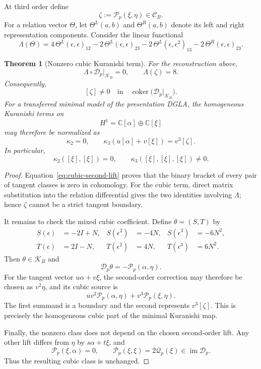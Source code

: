 \documentclass[11pt]{amsart}
\newtheorem{theorem}{Theorem}[section]
\newcommand{\coker}{\operatorname{coker}}
\newcommand{\cD}{\mathscr D}
\newcommand{\cQ}{\mathscr Q}
\newcommand{\cP}{\mathscr P}
\newcommand{\C}{\mathbb C}
\newcommand{\Rel}{\mathscr C}
\begin{document}
At third order define
\[
\zeta:=\cP_p(\xi,\eta)\in\Rel_B.
\]
For a relation vector $\Theta$, let $\Theta^L(a,b)$ and $\Theta^R(a,b)$ denote its left and right representation components.  Consider the linear functional
\begin{equation}\label{eq:cubic-certificate}
\Lambda(\Theta)
=
4\,\Theta^L(\epsilon,\epsilon)_{12}
-2\,\Theta^L(\epsilon,\epsilon)_{23}
-2\,\Theta^L(\epsilon,\epsilon^2)_{13}
-2\,\Theta^R(\epsilon,\epsilon)_{23}.
\end{equation}

\begin{theorem}[Nonzero cubic Kuranishi term]\label{thm:cubic-kuranishi}
For the reconstruction above,
\[
\Lambda\circ\cD_p|_{\mathcal K_B}=0,
\qquad
\Lambda(\zeta)=8.
\]
Consequently,
\[
[\zeta]\ne0
\quad\text{in}\quad
\coker\bigl(\cD_p|_{\mathcal K_B}\bigr).
\]
For a transferred minimal model of the presentation DGLA, the homogeneous Kuranishi terms on
\[
H^1=\C[\alpha]\oplus\C[\xi]
\]
may therefore be normalized as
\[
\boxed{
\kappa_2=0,
\qquad
\kappa_3(u[\alpha]+v[\xi])=v^3[\zeta].
}
\]
In particular,
\[
\kappa_2([\xi],[\xi])=0,
\qquad
\kappa_3([\xi],[\xi],[\xi])\ne0.
\]
\end{theorem}

\begin{proof}
Equation~\eqref{eq:cubic-second-lift} proves that the binary bracket of every pair of tangent classes is zero in cohomology.  For the cubic term, direct matrix substitution into the relation differential gives the two identities involving $\Lambda$; hence $\zeta$ cannot be a strict tangent boundary.

It remains to check the mixed cubic coefficient.  Define $\theta=(S,T)$ by
\begin{align*}
S(\epsilon)&=-2I+N,
&S(\epsilon^2)&=-4N,
&S(\epsilon^3)&=-6N^2,\\
T(\epsilon)&=2I-N,
&T(\epsilon^2)&=4N,
&T(\epsilon^3)&=6N^2.
\end{align*}
Then $\theta\in\mathcal K_B$ and
\[
\cD_p\theta=-\cP_p(\alpha,\eta).
\]
For the tangent vector $u\alpha+v\xi$, the second-order correction may therefore be chosen as $v^2\eta$, and its cubic source is
\[
uv^2\cP_p(\alpha,\eta)+v^3\cP_p(\xi,\eta).
\]
The first summand is a boundary and the second represents $v^3[\zeta]$.  This is precisely the homogeneous cubic part of the minimal Kuranishi map.

Finally, the nonzero class does not depend on the chosen second-order lift.  Any other lift differs from $\eta$ by $s\alpha+t\xi$, and
\[
\cP_p(\xi,\alpha)=0,
\qquad
\cP_p(\xi,\xi)=2\cQ_p(\xi)\in\operatorname{im}\cD_p.
\]
Thus the resulting cubic class is unchanged.
\end{proof}
\end{document}

